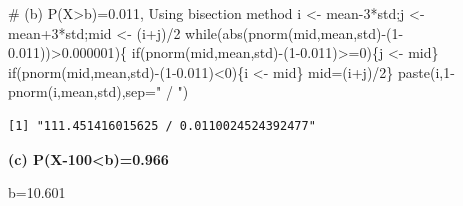 \documentclass[
  a4paper,
  DIV=11,
  numbers=noendperiod]{scrreprt}
\newenvironment{Shaded}{\begin{snugshade}}{\end{snugshade}}
\newcommand{\AttributeTok}[1]{\textcolor[rgb]{0.40,0.45,0.13}{#1}}
\newcommand{\CommentTok}[1]{\textcolor[rgb]{0.37,0.37,0.37}{#1}}
\newcommand{\ControlFlowTok}[1]{\textcolor[rgb]{0.00,0.23,0.31}{#1}}
\newcommand{\DecValTok}[1]{\textcolor[rgb]{0.68,0.00,0.00}{#1}}
\newcommand{\FloatTok}[1]{\textcolor[rgb]{0.68,0.00,0.00}{#1}}
\newcommand{\FunctionTok}[1]{\textcolor[rgb]{0.28,0.35,0.67}{#1}}
\newcommand{\NormalTok}[1]{\textcolor[rgb]{0.00,0.23,0.31}{#1}}
\newcommand{\OtherTok}[1]{\textcolor[rgb]{0.00,0.23,0.31}{#1}}
\newcommand{\SpecialCharTok}[1]{\textcolor[rgb]{0.37,0.37,0.37}{#1}}
\newcommand{\StringTok}[1]{\textcolor[rgb]{0.13,0.47,0.30}{#1}}
\begin{document}
\begin{Shaded}
\begin{Highlighting}[]
\CommentTok{\# (b) P(X\textgreater{}b)=0.011, Using bisection method}
\NormalTok{i }\OtherTok{\textless{}{-}}\NormalTok{ mean}\DecValTok{{-}3}\SpecialCharTok{*}\NormalTok{std;j }\OtherTok{\textless{}{-}}\NormalTok{ mean}\SpecialCharTok{+}\DecValTok{3}\SpecialCharTok{*}\NormalTok{std;mid }\OtherTok{\textless{}{-}}\NormalTok{ (i}\SpecialCharTok{+}\NormalTok{j)}\SpecialCharTok{/}\DecValTok{2}
\ControlFlowTok{while}\NormalTok{(}\FunctionTok{abs}\NormalTok{(}\FunctionTok{pnorm}\NormalTok{(mid,mean,std)}\SpecialCharTok{{-}}\NormalTok{(}\DecValTok{1}\FloatTok{{-}0.011}\NormalTok{))}\SpecialCharTok{\textgreater{}}\FloatTok{0.000001}\NormalTok{)\{}
  \ControlFlowTok{if}\NormalTok{(}\FunctionTok{pnorm}\NormalTok{(mid,mean,std)}\SpecialCharTok{{-}}\NormalTok{(}\DecValTok{1}\FloatTok{{-}0.011}\NormalTok{)}\SpecialCharTok{\textgreater{}=}\DecValTok{0}\NormalTok{)\{j }\OtherTok{\textless{}{-}}\NormalTok{ mid\}}
  \ControlFlowTok{if}\NormalTok{(}\FunctionTok{pnorm}\NormalTok{(mid,mean,std)}\SpecialCharTok{{-}}\NormalTok{(}\DecValTok{1}\FloatTok{{-}0.011}\NormalTok{)}\SpecialCharTok{\textless{}}\DecValTok{0}\NormalTok{)\{i }\OtherTok{\textless{}{-}}\NormalTok{ mid\}}
\NormalTok{  mid}\OtherTok{=}\NormalTok{(i}\SpecialCharTok{+}\NormalTok{j)}\SpecialCharTok{/}\DecValTok{2}\NormalTok{\}}
\FunctionTok{paste}\NormalTok{(i,}\DecValTok{1}\SpecialCharTok{{-}}\FunctionTok{pnorm}\NormalTok{(i,mean,std),}\AttributeTok{sep=}\StringTok{" / "}\NormalTok{)}
\end{Highlighting}
\end{Shaded}

\begin{verbatim}
[1] "111.451416015625 / 0.0110024524392477"
\end{verbatim}

\textbf{(c) P(\textbar X-100\textbar\textless b)=0.966}

b=10.601
\end{document}
